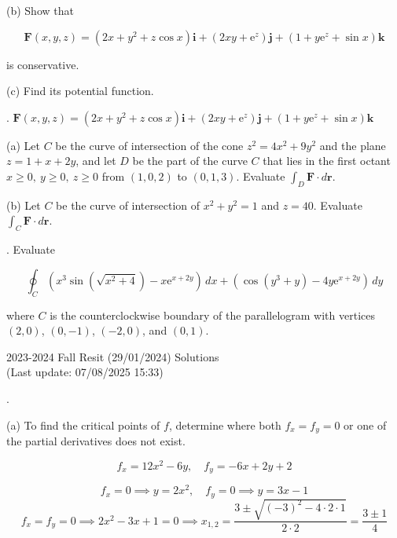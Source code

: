 \documentclass{article}
\begin{document}
\hfill

\noindent (b) Show that

\[\mathbf{F}(x,y,z)=\left(2x+y^2+z\cos x\right)\mathbf{i}+\left(2xy+\mathrm{e}^z\right)\mathbf{j}+\left(1+y\mathrm{e}^z+\sin x\right)\mathbf{k}\]

\hfill

\noindent is conservative.

\hfill

\noindent (c) Find its potential function.

\newpage

. $\mathbf{F}(x,y,z)=\left(2x+y^2+z\cos x\right)\mathbf{i}+\left(2xy+\mathrm{e}^z\right)\mathbf{j}+\left(1+y\mathrm{e}^z+\sin x\right)\mathbf{k}$

\hfill

\noindent (a) Let $C $ be the curve of intersection of the cone $z^2=4x^2+9y^2$ and the plane $z=1+x+2y$, and let $D$ be the part of the curve $C$ that lies in the first octant $x\geq0,\:y\geq0,\:z\geq0$ from $(1,0,2)$ to $(0,1,3)$. Evaluate $\int_D\mathbf{F}\cdot d\mathbf{r}$.

\hfill

\noindent (b) Let $C$ be the curve of intersection of $x^2+y^2=1$ and $z=40$. Evaluate $\int_C\mathbf{F}\cdot d\mathbf{r}$.

\hfill

. Evaluate

\[\oint_C\left(x^3\sin\left(\sqrt{x^2+4}\right)-x\mathrm{e}^{x+2y}\right)\,dx + \left(\cos\left(y^3+y\right)-4y\mathrm{e}^{x+2y}\right)\,dy\]

\hfill

\noindent where $C$ is the counterclockwise boundary of the parallelogram with vertices $(2,0)$, $(0,-1)$, $(-2,0)$, and $(0,1)$.

\newpage

\begin{center}
2023-2024 Fall Resit (29/01/2024) Solutions\\
(Last update: 07/08/2025 15:33)
\end{center}

.

\hfill

\noindent (a) To find the critical points of $f$, determine where both $f_x=f_y=0$ or one of the partial derivatives does not exist.

\[f_x=12x^2-6y,\quad f_y=-6x+2y+2\]

\[f_x=0\implies y=2x^2,\quad f_y=0\implies y=3x-1\]
\[f_x=f_y=0\implies 2x^2-3x+1=0\implies x_{1,2}=\frac{3\pm\sqrt{(-3)^2-4\cdot2\cdot 1}}{2\cdot2}=\frac{3\pm1}{4}\]
\end{document}
